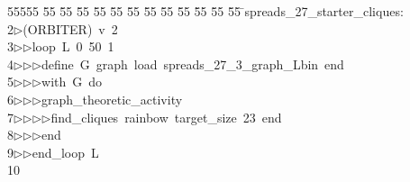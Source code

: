 %
%
\begin{tabbing}
55555 \= 55 \= 55 \= 55 \= 55 \= 55 \= 55 \= 55 \= 55 \= 55 \= 55 \= 55 \= 55 \= \>spreads\_27\_starter\_cliques:\\[0pt]
2\>$\triangleright$\>(ORBITER)\ v\ 2\ \\[0pt]
3\>$\triangleright$\>$\triangleright$\>loop\ L\ 0\ 50\ 1\ \\[0pt]
4\>$\triangleright$\>$\triangleright$\>$\triangleright$\>define\ G\ graph\ load\ spreads\_27\_3\_graph\_Lbin\ end\ \\[0pt]
5\>$\triangleright$\>$\triangleright$\>$\triangleright$\>with\ G\ do\ \\[0pt]
6\>$\triangleright$\>$\triangleright$\>$\triangleright$\>graph\_theoretic\_activity\ \\[0pt]
7\>$\triangleright$\>$\triangleright$\>$\triangleright$\>$\triangleright$\>find\_cliques\ rainbow\ target\_size\ 23\ end\ \\[0pt]
8\>$\triangleright$\>$\triangleright$\>$\triangleright$\>end\ \\[0pt]
9\>$\triangleright$\>$\triangleright$\>end\_loop\ L\\[0pt]
10\>\end{tabbing}
